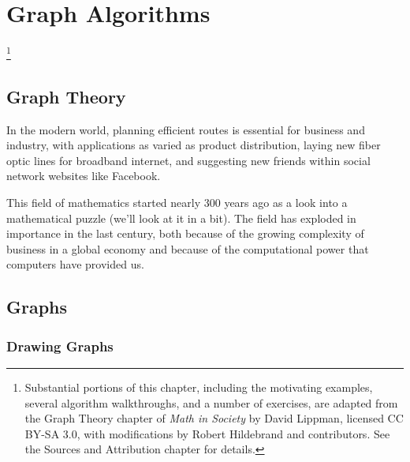 %
\chapter{Graph Algorithms}\footnote{Substantial portions of this chapter, including the motivating examples, several algorithm walkthroughs, and a number of exercises, are adapted from the Graph Theory chapter of \emph{Math in Society} by David Lippman, licensed CC BY-SA 3.0, with modifications by Robert Hildebrand and contributors. See the Sources and Attribution chapter for details.}

\section{Graph Theory}
In the modern world, planning efficient routes is essential for business and industry, with applications as varied as product distribution, laying new fiber optic lines for broadband internet, and suggesting new friends within social network websites like Facebook.

This field of mathematics started nearly 300 years ago as a look into a mathematical puzzle (we'll look at it in a bit).  The field has exploded in importance in the last century, both because of the growing complexity of business in a global economy and because of the computational power that computers have provided us.  
\section{Graphs}
\subsection{Drawing Graphs}

